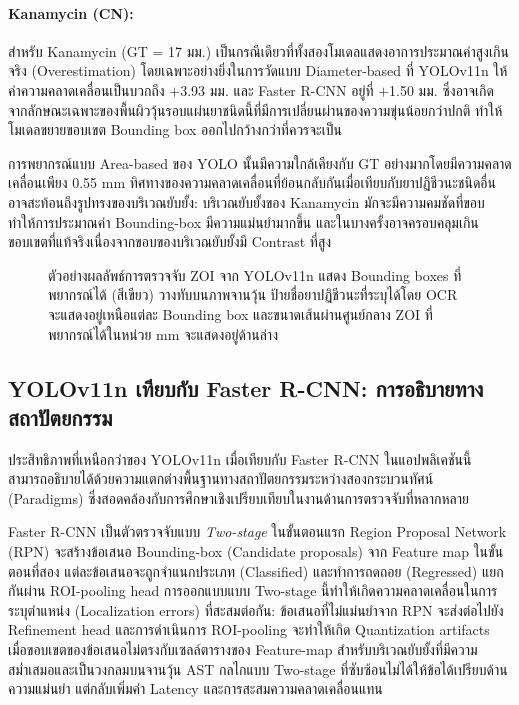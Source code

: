 \paragraph{Kanamycin (CN):}
สำหรับ Kanamycin (GT = 17 มม.) เป็นกรณีเดียวที่ทั้งสองโมเดลแสดงอาการประมาณค่าสูงเกินจริง (Overestimation) โดยเฉพาะอย่างยิ่งในการวัดแบบ Diameter-based ที่ YOLOv11n ให้ค่าความคลาดเคลื่อนเป็นบวกถึง $+$3.93 มม. และ Faster R-CNN อยู่ที่ $+$1.50 มม. ซึ่งอาจเกิดจากลักษณะเฉพาะของพื้นผิววุ้นรอบแผ่นยาชนิดนี้ที่มีการเปลี่ยนผ่านของความขุ่นน้อยกว่าปกติ ทำให้โมเดลขยายขอบเขต Bounding box ออกไปกว้างกว่าที่ควรจะเป็น

การพยากรณ์แบบ Area-based ของ YOLO นั้นมีความใกล้เคียงกับ GT อย่างมากโดยมีความคลาดเคลื่อนเพียง 0.55 mm
ทิศทางของความคลาดเคลื่อนที่ย้อนกลับกันเมื่อเทียบกับยาปฏิชีวนะชนิดอื่นอาจสะท้อนถึงรูปทรงของบริเวณยับยั้ง: บริเวณยับยั้งของ Kanamycin มักจะมีความคมชัดที่ขอบ ทำให้การประมาณค่า Bounding-box มีความแม่นยำมากขึ้น และในบางครั้งอาจครอบคลุมเกินขอบเขตที่แท้จริงเนื่องจากขอบของบริเวณยับยั้งมี Contrast ที่สูง

\begin{figure}[H]
  \centering
  \caption{ตัวอย่างผลลัพธ์การตรวจจับ ZOI จาก YOLOv11n แสดง Bounding boxes ที่พยากรณ์ได้ (สีเขียว) วางทับบนภาพจานวุ้น
           ป้ายชื่อยาปฏิชีวนะที่ระบุได้โดย OCR จะแสดงอยู่เหนือแต่ละ Bounding box
           และขนาดเส้นผ่านศูนย์กลาง ZOI ที่พยากรณ์ได้ในหน่วย mm จะแสดงอยู่ด้านล่าง}
  \label{fig:detection_result}
\end{figure}

\subsection{YOLOv11n เทียบกับ Faster R-CNN: การอธิบายทางสถาปัตยกรรม}

ประสิทธิภาพที่เหนือกว่าของ YOLOv11n เมื่อเทียบกับ Faster R-CNN ในแอปพลิเคชันนี้
สามารถอธิบายได้ด้วยความแตกต่างพื้นฐานทางสถาปัตยกรรมระหว่างสองกระบวนทัศน์ (Paradigms)
ซึ่งสอดคล้องกับการศึกษาเชิงเปรียบเทียบในงานด้านการตรวจจับที่หลากหลาย \cite{sharma2024yolo_comparison}

Faster R-CNN \cite{ren2015faster} เป็นตัวตรวจจับแบบ \emph{Two-stage}
ในขั้นตอนแรก Region Proposal Network (RPN) จะสร้างข้อเสนอ Bounding-box (Candidate proposals) จาก Feature map
ในขั้นตอนที่สอง แต่ละข้อเสนอจะถูกจำแนกประเภท (Classified) และทำการถดถอย (Regressed) แยกกันผ่าน ROI-pooling head
การออกแบบแบบ Two-stage นี้ทำให้เกิดความคลาดเคลื่อนในการระบุตำแหน่ง (Localization errors) ที่สะสมต่อกัน:
ข้อเสนอที่ไม่แม่นยำจาก RPN จะส่งต่อไปยัง Refinement head
และการดำเนินการ ROI-pooling จะทำให้เกิด Quantization artifacts เมื่อขอบเขตของข้อเสนอไม่ตรงกับเซลล์ตารางของ Feature-map
สำหรับบริเวณยับยั้งที่มีความสม่ำเสมอและเป็นวงกลมบนจานวุ้น AST กลไกแบบ Two-stage ที่ซับซ้อนไม่ได้ให้ข้อได้เปรียบด้านความแม่นยำ
แต่กลับเพิ่มค่า Latency และการสะสมความคลาดเคลื่อนแทน

